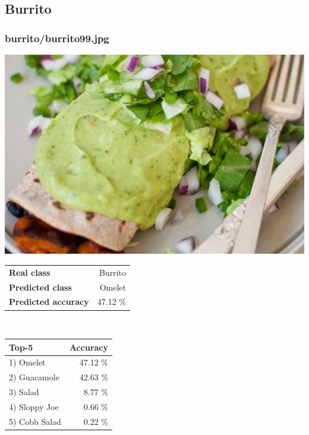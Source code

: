 \subsection{Burrito}
    
\subsubsection{burrito/burrito99.jpg}

\begin{minipage}[t]{0.4\textwidth}
	\vspace{0pt}
	\includegraphics[width=\linewidth]{images/evaluation-images/burrito/burrito99.jpg}
\end{minipage}
\hfill
\begin{minipage}[t]{0.5\textwidth}
	\vspace{0pt}\raggedright
	\begin{tabularx}{\textwidth}{X r}
		\small \textbf{Real class} & \small Burrito\\
		\small \textbf{Predicted class} & \small Omelet\\
		\small \textbf{Predicted accuracy} & \small 47.12 \%
    \end{tabularx}\\
    
    \vspace{6pt}
	\begin{tabularx}{\textwidth}{X r}
        \small \textbf{Top-5} & \small \textbf{Accuracy} \\
        \hline
		\small 1) Omelet & \small 47.12 \%\\\small 2) Guacamole & \small 42.63 \%\\\small 3) Salad & \small 8.77 \%\\\small 4) Sloppy Joe & \small 0.66 \%\\\small 5) Cobb Salad & \small 0.22 \%
    \end{tabularx}
\end{minipage}
    
